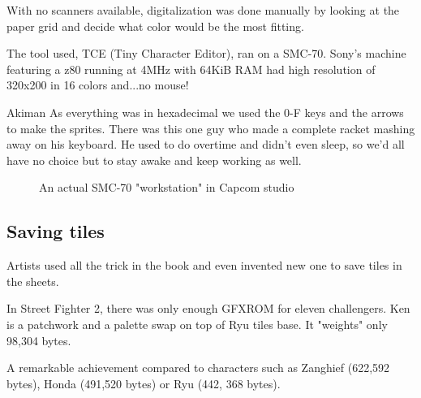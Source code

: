 With no scanners available, digitalization was done manually by looking at the paper grid and decide what color would be the most fitting.




The tool used, TCE (Tiny Character Editor), ran on a SMC-70. Sony's machine featuring a z80 running at 4MHz with 64KiB RAM had high resolution of 320x200 in 16 colors and...no mouse!

\begin{q}{Akiman\cite{ar20160404}}
  As everything was in hexadecimal we used the 0-F keys and the arrows to make the sprites. There was this one guy who made a complete racket mashing away on his keyboard. He used to do overtime and didn't even sleep, so we'd all have no choice but to stay awake and keep working as well.
\end{q}

 \begin{figure}[H]
\caption*{An actual SMC-70 "workstation" in Capcom studio}
\end{figure}









\subsection{Saving tiles}
Artists used all the trick in the book and even invented new one to save tiles in the sheets. 

In Street Fighter 2, there was only enough GFXROM for eleven challengers. Ken is a patchwork and a palette swap on top of Ryu tiles base. It "weights" only 98,304 bytes. 

A remarkable achievement compared to characters such as Zanghief (622,592 bytes), Honda (491,520 bytes) or Ryu (442, 368 bytes). 

\begin{minipage}[t]{0.19\linewidth}
\end{minipage}%
\hfill%
\begin{minipage}[t]{0.19\linewidth}
\end{minipage}
\hfill%
\begin{minipage}[t]{0.19\linewidth}
\end{minipage}%
\hfill%
\begin{minipage}[t]{0.19\linewidth}
\end{minipage}
\hfill%
\begin{minipage}[t]{0.19\linewidth}
\end{minipage}

